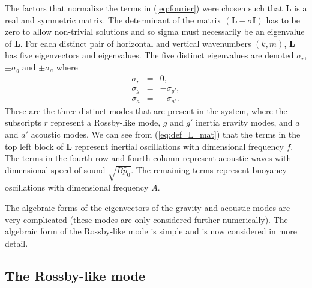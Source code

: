 \documentclass[times]{qjrms4}
\begin{document}
 
The factors that normalize the terms in  (\ref{eq:fourier}) were chosen such 
that $\mathbf L$ is a real and symmetric matrix.  The determinant of the matrix 
$(\mathbf {L} - \sigma \mathbf{I})$ has to be zero to allow non-trivial solutions 
and so sigma must necessarily be an eigenvalue of $\mathbf L$.
For each distinct pair of horizontal and vertical wavenumbers $(k,m)$, $\mathbf L$ 
has five eigenvectors and eigenvalues.
The five distinct eigenvalues are denoted $\sigma_r$, $\pm \sigma_g$ and $\pm \sigma_a$ where
\begin{eqnarray}
\sigma_r &=& 0, \nonumber \\
\sigma_g &=& - \sigma_{g'}, \nonumber \\
\sigma_a &=& - \sigma_{a'}.
\end{eqnarray}
These are the three distinct modes that are present in the system, where the subscripts $r$ represent a Rossby-like mode, $g$ and $g'$ inertia gravity modes, and $a$ and $a'$ acoustic modes. 
We can see from (\ref{eq:def_L_mat}) that the terms in the top left block of ${\mathbf L}$ represent inertial oscillations with dimensional frequency $f$. The terms in the fourth row and fourth column represent acoustic waves with dimensional speed of sound $\sqrt{B \tilde {p_0} }$. 
The remaining terms represent buoyancy oscillations with dimensional frequency $A$.




The algebraic forms of the eigenvectors of the gravity and acoustic modes are very complicated (these
modes are only considered further numerically).
The algebraic form of the Rossby-like mode is simple and is now considered in more detail.


\subsection{The Rossby-like mode}
\end{document}
